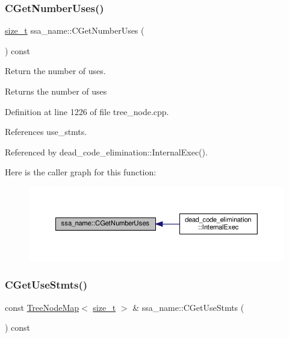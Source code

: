 \subsubsection{\texorpdfstring{C\+Get\+Number\+Uses()}{CGetNumberUses()}}
{\footnotesize\ttfamily \hyperlink{tutorial__fpt__2017_2intro_2sixth_2test_8c_a7c94ea6f8948649f8d181ae55911eeaf}{size\+\_\+t} ssa\+\_\+name\+::\+C\+Get\+Number\+Uses (\begin{DoxyParamCaption}{ }\end{DoxyParamCaption}) const}



Return the number of uses. 

\begin{DoxyReturn}{Returns}
the number of uses 
\end{DoxyReturn}


Definition at line 1226 of file tree\+\_\+node.\+cpp.



References use\+\_\+stmts.



Referenced by dead\+\_\+code\+\_\+elimination\+::\+Internal\+Exec().

Here is the caller graph for this function\+:
\nopagebreak
\begin{figure}[H]
\begin{center}
\leavevmode
\includegraphics[width=350pt]{db/d2f/structssa__name_ac3fa81e7dc097efbbcd404224f8309cd_icgraph}
\end{center}
\end{figure}
\mbox{\label{structssa__name_acdb4743f93ac497cce42a54359785b00}} 
\subsubsection{\texorpdfstring{C\+Get\+Use\+Stmts()}{CGetUseStmts()}}
{\footnotesize\ttfamily const \hyperlink{classTreeNodeMap}{Tree\+Node\+Map}$<$ \hyperlink{tutorial__fpt__2017_2intro_2sixth_2test_8c_a7c94ea6f8948649f8d181ae55911eeaf}{size\+\_\+t} $>$ \& ssa\+\_\+name\+::\+C\+Get\+Use\+Stmts (\begin{DoxyParamCaption}{ }\end{DoxyParamCaption}) const}



